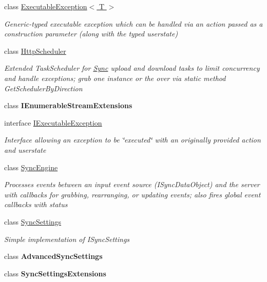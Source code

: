 \begin{DoxyCompactItemize}
\item 
class \hyperlink{class_cloud_api_public_1_1_sync_1_1_executable_exception_3_01_t_01_4}{Executable\-Exception$<$ T $>$}
\begin{DoxyCompactList}\small\item\em Generic-\/typed executable exception which can be handled via an action passed as a construction parameter (along with the typed userstate) \end{DoxyCompactList}\item 
class \hyperlink{class_cloud_api_public_1_1_sync_1_1_http_scheduler}{Http\-Scheduler}
\begin{DoxyCompactList}\small\item\em Extended Task\-Scheduler for \hyperlink{namespace_cloud_api_public_1_1_sync}{Sync} upload and download tasks to limit concurrency and handle exceptions; grab one instance or the over via static method Get\-Scheduler\-By\-Direction \end{DoxyCompactList}\item 
class {\bfseries I\-Enumerable\-Stream\-Extensions}
\item 
interface \hyperlink{interface_cloud_api_public_1_1_sync_1_1_i_executable_exception}{I\-Executable\-Exception}
\begin{DoxyCompactList}\small\item\em Interface allowing an exception to be \char`\"{}executed\char`\"{} with an originally provided action and userstate \end{DoxyCompactList}\item 
class \hyperlink{class_cloud_api_public_1_1_sync_1_1_sync_engine}{Sync\-Engine}
\begin{DoxyCompactList}\small\item\em Processes events between an input event source (I\-Sync\-Data\-Object) and the server with callbacks for grabbing, rearranging, or updating events; also fires global event callbacks with status \end{DoxyCompactList}\item 
class \hyperlink{class_cloud_api_public_1_1_sync_1_1_sync_settings}{Sync\-Settings}
\begin{DoxyCompactList}\small\item\em Simple implementation of I\-Sync\-Settings \end{DoxyCompactList}\item 
class {\bfseries Advanced\-Sync\-Settings}
\item 
class {\bfseries Sync\-Settings\-Extensions}
\end{DoxyCompactItemize}
